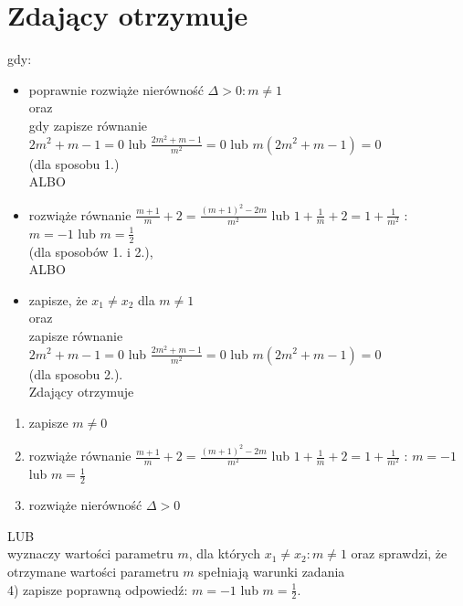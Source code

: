 \documentclass[10pt]{article}
\begin{document}
\section*{Zdający otrzymuje}
gdy:

\begin{itemize}
  \item poprawnie rozwiąże nierówność $\Delta>0: m \neq 1$\\
oraz\\
gdy zapisze równanie\\
$2 m^{2}+m-1=0$ lub $\frac{2 m^{2}+m-1}{m^{2}}=0$ lub $m\left(2 m^{2}+m-1\right)=0$\\
(dla sposobu 1.)\\
ALBO
  \item rozwiąże równanie $\frac{m+1}{m}+2=\frac{(m+1)^{2}-2 m}{m^{2}}$ lub $1+\frac{1}{m}+2=1+\frac{1}{m^{2}}$ :\\
$m=-1$ lub $m=\frac{1}{2}$\\
(dla sposobów 1. i 2.),\\
ALBO
  \item zapisze, że $x_{1} \neq x_{2}$ dla $m \neq 1$\\
oraz\\
zapisze równanie\\
$2 m^{2}+m-1=0$ lub $\frac{2 m^{2}+m-1}{m^{2}}=0$ lub $m\left(2 m^{2}+m-1\right)=0$\\
(dla sposobu 2.).\\
Zdający otrzymuje
\end{itemize}

\begin{enumerate}
  \item zapisze $m \neq 0$
  \item rozwiąże równanie $\frac{m+1}{m}+2=\frac{(m+1)^{2}-2 m}{m^{2}}$ lub $1+\frac{1}{m}+2=1+\frac{1}{m^{2}}$ : $m=-1$ lub $m=\frac{1}{2}$
  \item rozwiąże nierówność $\Delta>0$
\end{enumerate}

LUB\\
wyznaczy wartości parametru $m$, dla których $x_{1} \neq x_{2}: m \neq 1$ oraz sprawdzi, że otrzymane wartości parametru $m$ spełniają warunki zadania\\
4) zapisze poprawną odpowiedź: $m=-1$ lub $m=\frac{1}{2}$.
\end{document}
